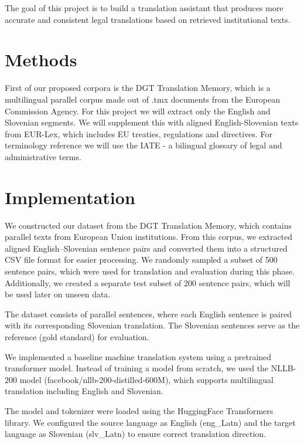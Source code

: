 \documentclass[fleqn,moreauthors,10pt]{ds_report}
\begin{document}
The goal of this project is to build a translation assistant that produces more accurate and consistent legal translations based on retrieved institutional texts. 

\section*{Methods}

First of our proposed corpora is the DGT Translation Memory, which is a multilingual parallel corpus made out of .tmx documents from the European Commission Agency\cite{DGT_Translation_Memory}. For this project we will extract only the English and Slovenian segments. We will supplement this with aligned English-Slovenian texts from EUR-Lex, which includes EU treaties, regulations and directives\cite{EUR-Lex}. For terminology reference we will use the IATE - a bilingual glossary of legal and administrative terms\cite{IATE_-_Interactive_Terminology_for_Europe}. 

\section*{Implementation}
We constructed our dataset from the DGT Translation Memory, which contains parallel texts from European Union institutions. From this corpus, we extracted aligned English–Slovenian sentence pairs and converted them into a structured CSV file format for easier processing.
We randomly sampled a subset of 500 sentence pairs, which were used for translation and evaluation during this phase. Additionally, we created a separate test subset of 200 sentence pairs, which will be used later on unseen data.

The dataset consists of parallel sentences, where each English sentence is paired with its corresponding Slovenian translation. The Slovenian sentences serve as the reference (gold standard) for evaluation.

We implemented a baseline machine translation system using a pretrained transformer model. Instead of training a model from scratch, we used the NLLB-200 model (facebook/nllb-200-distilled-600M), which supports multilingual translation including English and Slovenian.

The model and tokenizer were loaded using the HuggingFace Transformers library. We configured the source language as English (eng\_Latn) and the target language as Slovenian (slv\_Latn) to ensure correct translation direction.
\end{document}
